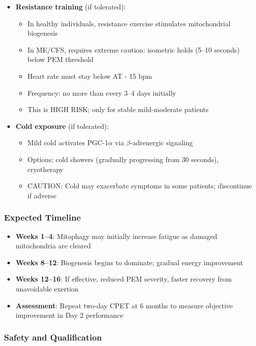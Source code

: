 \begin{itemize}
    \item \textbf{Resistance training} (if tolerated):
    \begin{itemize}
        \item In healthy individuals, resistance exercise stimulates mitochondrial biogenesis
        \item In ME/CFS, requires extreme caution: isometric holds (5--10 seconds) below PEM threshold
        \item Heart rate must stay below AT - 15 bpm
        \item Frequency: no more than every 3--4 days initially
        \item This is HIGH RISK; only for stable mild-moderate patients
    \end{itemize}

    \item \textbf{Cold exposure} (if tolerated):
    \begin{itemize}
        \item Mild cold activates PGC-1$\alpha$ via $\beta$-adrenergic signaling
        \item Options: cold showers (gradually progressing from 30 seconds), cryotherapy
        \item CAUTION: Cold may exacerbate symptoms in some patients; discontinue if adverse
    \end{itemize}
\end{itemize}

\subsubsection{Expected Timeline}

\begin{itemize}
    \item \textbf{Weeks 1--4}: Mitophagy may initially increase fatigue as damaged mitochondria are cleared
    \item \textbf{Weeks 8--12}: Biogenesis begins to dominate; gradual energy improvement
    \item \textbf{Weeks 12--16}: If effective, reduced PEM severity, faster recovery from unavoidable exertion
    \item \textbf{Assessment}: Repeat two-day CPET at 6 months to measure objective improvement in Day 2 performance
\end{itemize}

\subsubsection{Safety and Qualification}

